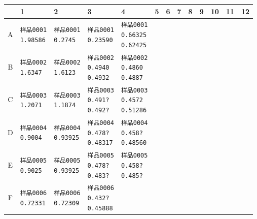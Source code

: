 \documentclass[UTF8,10pt,a4paper,fontset=fandol]{ctexart}
\renewcommand{\arraystretch}{1.15}
\begin{document}
\begingroup
\scriptsize
\setlength{\tabcolsep}{1pt}
\renewcommand{\arraystretch}{1.45}
\begin{tabular}{|c|*{12}{p{0.47cm}|}}
\hline
 & 1 & 2 & 3 & 4 & 5 & 6 & 7 & 8 & 9 & 10 & 11 & 12\\
\hline
A &
\texttt{样品0001\\1.98586} &
\texttt{样品0001\\0.2745} &
\texttt{样品0001\\0.23590} &
\texttt{样品0001\\0.66325\\0.62425} &
 & & & & & & &\\
\hline
B &
\texttt{样品0002\\1.6347} &
\texttt{样品0002\\1.6123} &
\texttt{样品0002\\0.4940\\0.4932} &
\texttt{样品0002\\0.4860\\0.4887} &
 & & & & & & &\\
\hline
C &
\texttt{样品0003\\1.2071} &
\texttt{样品0003\\1.1874} &
\texttt{样品0003\\0.491?\\0.492?} &
\texttt{样品0003\\0.4572\\0.51286} &
 & & & & & & &\\
\hline
D &
\texttt{样品0004\\0.9004} &
\texttt{样品0004\\0.93925} &
\texttt{样品0004\\0.478?\\0.48317} &
\texttt{样品0004\\0.458?\\0.48560} &
 & & & & & & &\\
\hline
E &
\texttt{样品0005\\0.9025} &
\texttt{样品0005\\0.93925} &
\texttt{样品0005\\0.478?\\0.483?} &
\texttt{样品0005\\0.458?\\0.485?} &
 & & & & & & &\\
\hline
F &
\texttt{样品0006\\0.72331} &
\texttt{样品0006\\0.72309} &
\texttt{样品0006\\0.432?\\0.45888} &

\end{tabular}
\end{document}
